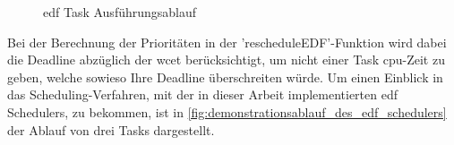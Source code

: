\documentclass[../EDF Master Thesis.tex]{subfiles}
\begin{document}
    \begin{figure}[ht!]
        \begin{center}
        \end{center}
        \caption{\ac{edf} Task Ausführungsablauf}
        \label{fig:edf_task_ausfuehrungsablauf}
    \end{figure}
    
    Bei der Berechnung der Prioritäten in der 'rescheduleEDF'-Funktion wird dabei die Deadline abzüglich der \ac{wcet} berücksichtigt, um nicht einer Task \ac{cpu}-Zeit zu geben, welche sowieso Ihre Deadline überschreiten würde.
    Um einen Einblick in das Scheduling-Verfahren, mit der in dieser Arbeit implementierten \ac{edf} Schedulers, zu bekommen, ist in \autoref{fig:demonstrationsablauf_des_edf_schedulers} der Ablauf von drei Tasks dargestellt.
\end{document}
